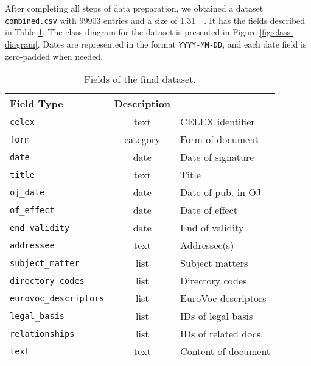 \documentclass[sigconf, authorversion]{acmart}
\begin{document}
After completing all steps of data preparation, we obtained a dataset \texttt{combined.csv} with \SI{99903}{} entries and a size of \SI{1.31}{\giga\byte}. It has the fields described in Table \ref{tab:fields}.
The class diagram for the dataset is presented in Figure \ref{fig:class-diagram}.
Dates are represented in the format \texttt{YYYY-MM-DD}, and each date field is zero-padded when needed.

\begin{table}[ht]
    \centering
    \caption{Fields of the final dataset.} \label{tab:fields}
    \begin{tabular}{@{}l|c|l@{}}
        \textbf{Field}               \textbf{Type}   & \textbf{Description}    \\ \hline
        \texttt{celex}                  & text            & CELEX identifier        \\
        \texttt{form}                   & category        & Form of document        \\
        \texttt{date}                   & date            & Date of signature       \\
        \texttt{title}                  & text            & Title                   \\
        \texttt{oj\_date}               & date            & Date of pub. in OJ      \\
        \texttt{of\_effect}             & date            & Date of effect          \\
        \texttt{end\_validity}          & date            & End of validity         \\
        \texttt{addressee}              & text            & Addressee(s)            \\
        \texttt{subject\_matter}        & list            & Subject matters         \\
        \texttt{directory\_codes}       & list            & Directory codes         \\
        \texttt{eurovoc\_descriptors}   & list            & EuroVoc descriptors     \\
        \texttt{legal\_basis}           & list            & IDs of legal basis      \\
        \texttt{relationships}          & list            & IDs of related docs.    \\
        \texttt{text}                   & text            & Content of document     \\
    \end{tabular}
\end{table}
\end{document}
